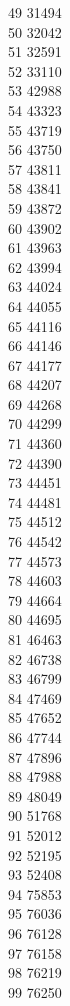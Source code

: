 { 49	31494 \\
 50	32042 \\
 51	32591 \\
 52	33110 \\
 53	42988 \\
 54	43323 \\
 55	43719 \\
 56	43750 \\
 57	43811 \\
 58	43841 \\
 59	43872 \\
 60	43902 \\
 61	43963 \\
 62	43994 \\
 63	44024 \\
 64	44055 \\
 65	44116 \\
 66	44146 \\
 67	44177 \\
 68	44207 \\
 69	44268 \\
 70	44299 \\
 71	44360 \\
 72	44390 \\
 73	44451 \\
 74	44481 \\
 75	44512 \\
 76	44542 \\
 77	44573 \\
 78	44603 \\
 79	44664 \\
 80	44695 \\
 81	46463 \\
 82	46738 \\
 83	46799 \\
 84	47469 \\
 85	47652 \\
 86	47744 \\
 87	47896 \\
 88	47988 \\
 89	48049 \\
 90	51768 \\
 91	52012 \\
 92	52195 \\
 93	52408 \\
 94	75853 \\
 95	76036 \\
 96	76128 \\
 97	76158 \\
 98	76219 \\
 99	76250 \\
}
